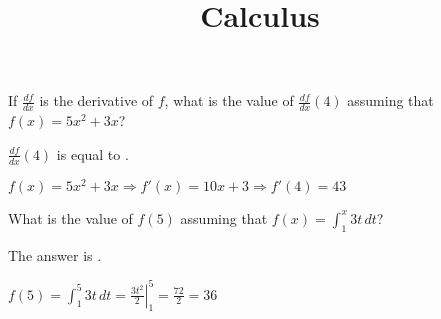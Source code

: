 \documentclass{ximera}
\title{Calculus}
\begin{document}
\maketitle

\begin{question}
If $\frac{df}{dx}$ is the derivative of $f$, what is the value of
$\frac{df}{dx}(4)$ assuming that $f(x) = 5x^2 +3x$?

\begin{solution}
$\frac{df}{dx}(4)$ is equal to .
\end{solution}
$f(x) = 5x^2 + 3x \Rightarrow f'(x) = 10 x + 3 \Rightarrow f'(4) = 43$
\end{question}

\begin{question}
What is the value of $f(5) $ assuming that $f(x) = \int_1^x 3t \,dt$?
\begin{solution}
The answer is .
\end{solution}
$f(5) = \int_1^5 3t \,dt = \left. \frac{3t^2}{2} \right|_1^5 =
\frac{72}{2} = 36$
\end{question}
\end{document}
